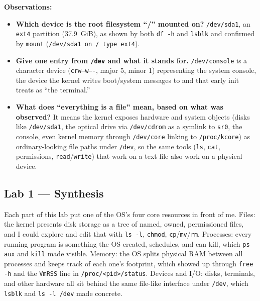 \noindent\textbf{Observations:}
\begin{itemize}
  \item \textbf{Which device is the root filesystem ``/'' mounted on?}
        \texttt{/dev/sda1}, an \texttt{ext4} partition (37.9~GiB), as shown by
        both \texttt{df -h} and \texttt{lsblk} and confirmed by \texttt{mount}
        (\texttt{/dev/sda1 on / type ext4}).
  \item \textbf{Give one entry from \texttt{/dev} and what it stands for.}
        \texttt{/dev/console} is a character device (\texttt{crw--w----}, major
        5, minor 1) representing the system console, the device the kernel
        writes boot/system messages to and that early init treats as ``the
        terminal.''
  \item \textbf{What does ``everything is a file'' mean, based on what was
        observed?} It means the kernel exposes hardware and system objects
        (disks like \texttt{/dev/sda1}, the optical drive via
        \texttt{/dev/cdrom} as a symlink to \texttt{sr0}, the console, even
        kernel memory through \texttt{/dev/core} linking to
        \texttt{/proc/kcore}) as ordinary-looking file paths under
        \texttt{/dev}, so the same tools (\texttt{ls}, \texttt{cat},
        permissions, \texttt{read}/\texttt{write}) that work on a text file
        also work on a physical device.
\end{itemize}

\subsection*{Lab 1 --- Synthesis}

\hspace{0.8cm} Each part of this lab put one of the OS's four core resources in
front of me. Files: the kernel presents disk storage as a tree of named, owned,
permissioned files, and I could explore and edit that with \texttt{ls -l},
\texttt{chmod}, \texttt{cp}/\texttt{mv}/\texttt{rm}. Processes: every running
program is something the OS created, schedules, and can kill, which
\texttt{ps aux} and \texttt{kill} made visible. Memory: the OS splits physical
RAM between all processes and keeps track of each one's footprint, which
showed up through \texttt{free -h} and the \texttt{VmRSS} line in
\texttt{/proc/<pid>/status}. Devices and I/O: disks, terminals, and other
hardware all sit behind the same file-like interface under \texttt{/dev}, which
\texttt{lsblk} and \texttt{ls -l /dev} made concrete.

